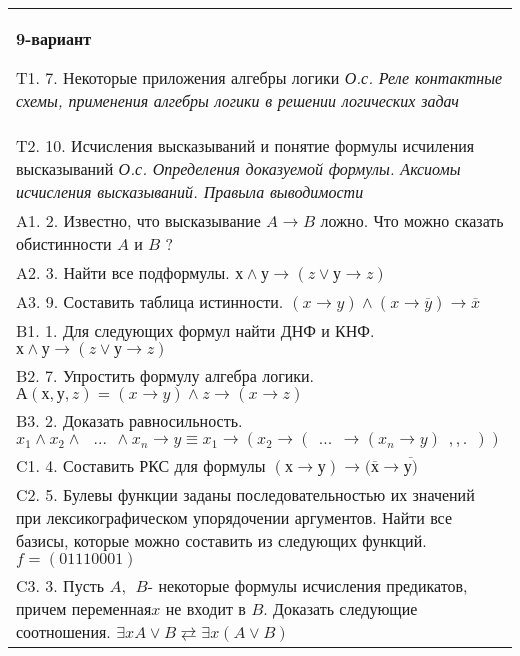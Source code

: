 \documentclass{article}
\begin{document}
\begin{tabular}{m{17cm}}
\textbf{9-вариант}
\newline

T1. 7. Некоторые приложения алгебры логики \emph{О.с. Реле контактные схемы, применения алгебры логики в решении логических задач} \\
T2. 10. Исчисления высказываний и понятие формулы исчиления высказываний \emph{О.с. Определения доказуемой формулы. Аксиомы исчисления высказываний. Правыла выводимости} \\
A1. 2. Известно, что высказывание \(A \rightarrow B\) ложно. Что можно сказать обистинности \(A\) и \(B\) ? \\
A2. 3. Найти все подформулы. \(х \land у \rightarrow (z \vee у \rightarrow z)\) \\
A3. 9. Составить таблица истинности. \((x \rightarrow y) \land (x \rightarrow \overline{y}) \rightarrow \overline{x}\) \\
B1. 1. Для следующих формул найти ДНФ и КНФ. \(х \land у \rightarrow (z \vee у \rightarrow z)\) \\
B2. 7. Упростить формулу алгебра логики. \(А(х,у,z) = (x \rightarrow y) \land z \rightarrow (x \rightarrow z)\) \\
B3. 2. Доказать равносильность.\(x_{1} \land x_{2} \land \ \ \ ...\ \  \land x_{n} \rightarrow y \equiv x_{1} \rightarrow (x_{2} \rightarrow (\ \ ...\ \  \rightarrow (x_{n} \rightarrow y)\ \ ,,.\ \ ))\) \\
C1. 4. Составить РКС для формулы \((х \rightarrow у) \rightarrow (\overline{х} \rightarrow \overline{у)}\) \\
C2. 5. Булевы функции заданы последовательностью их значений при лексикографическом упорядочении аргументов. Найти все базисы, которые можно составить из следующих функций. \(f = (01110001)\) \\
C3. 3. Пусть \(A,\ \ B\)- некоторые формулы исчисления предикатов, причем переменная\(x\) не входит в \(B\). Доказать следующие соотношения. \(\exists xA \vee B \rightleftarrows \exists x(A \vee B)\) \\

\end{tabular}
\vspace{1cm}
\end{document}
